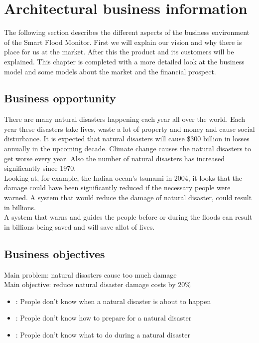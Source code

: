\chapter{Architectural business information}
\label{ch:business}
The following section describes the different aspects of the business environment of the Smart Flood Monitor. First we will explain our vision and why there is place for us at the market. After this the product and its customers will be explained. This chapter is completed with a more detailed look at the business model and some models about the market and the financial prospect.


\section{Business opportunity}
There are many natural disasters happening each year all over the world. Each year these disasters take lives, waste a lot of property and money and cause social disturbance. It is expected that natural disasters will cause \$300 billion in losses annually in the upcoming decade. Climate change causes the natural disasters to get worse every year. Also the number of natural disasters has increased significantly since 1970.\\
Looking at, for example, the Indian ocean's tsunami in 2004, it looks that the damage could have been significantly reduced if the necessary people were warned. A system that would reduce the damage of natural disaster, could result in billions. \\
A system that warns and guides the people before or during the floods can result in billions being saved and will save allot of lives.


\section{Business objectives}
Main problem: natural disasters cause too much damage\\
Main objective: reduce natural disaster damage costs by 20\%

\begin{itemize}
	\item {}: People don't know when a natural disaster is about to happen
	\item {}: People don't know how to prepare for a natural disaster
	\item {}: People don't know what to do during a natural disaster
\end{itemize}

